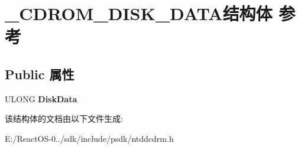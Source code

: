 \hypertarget{struct___c_d_r_o_m___d_i_s_k___d_a_t_a}{}\section{\+\_\+\+C\+D\+R\+O\+M\+\_\+\+D\+I\+S\+K\+\_\+\+D\+A\+T\+A结构体 参考}
\label{struct___c_d_r_o_m___d_i_s_k___d_a_t_a}
\subsection*{Public 属性}
\begin{DoxyCompactItemize}
\item 
\mbox{\label{struct___c_d_r_o_m___d_i_s_k___d_a_t_a_a868b2f8e2b63592f9a1e0f255a91a243}} 
U\+L\+O\+NG {\bfseries Disk\+Data}
\end{DoxyCompactItemize}


该结构体的文档由以下文件生成\+:\begin{DoxyCompactItemize}
\item 
E\+:/\+React\+O\+S-\/0../sdk/include/psdk/ntddcdrm.\+h\end{DoxyCompactItemize}
